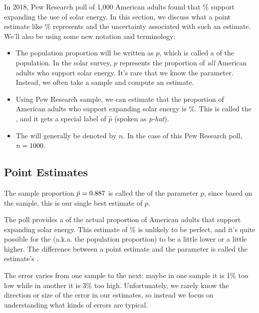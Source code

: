 In 2018, Pew Research poll of 1,000 American adults found that
\pewsolarpollpercent{}\% support expanding the use of solar energy.
In this section, we discuss what a point estimate like
\pewsolarpollpercent{}\% represents
and the uncertainty associated with such an estimate. We'll also
be using some new notation and terminology:
\begin{itemize}
\item The population proportion will be written as $p$, which
    is called a  of the population. In the solar
    survey, $p$ represents the proportion of \emph{all}
    American adults who support solar energy. It's rare
    that we know the parameter. Instead, we often
    take a sample and compute an estimate.
\item Using Pew Research sample, we can estimate that the proportion
    of American adults who support expanding solar energy is
    \pewsolarpollpercent{}\%.
    This is called the , and it gets a special
    label of $\hat{p}$ (spoken as \emph{p-hat}).
\item The  will generally
    be denoted by $n$. In the case of this Pew Research poll,
    $n = 1000{}$.
\end{itemize}

\subsection{Point Estimates}
\label{pointEstimates}


The sample proportion $\hat{p} = 0.887{}$ is called
the  of the parameter $p$, since based
on the sample, this is our single best estimate of $p$.

The poll provides a  of the actual proportion
of American adults that support expanding solar energy.
This estimate of \pewsolarpollpercent{}\% is unlikely to be perfect,
and it's quite possible for the 
(a.k.a. the population proportion) to be a little lower
or a little higher. The difference between a point estimate
and the parameter is called the estimate's .

The error varies from one sample to the next: maybe
in one sample it is 1\% too low while in another
it is 3\% too high. Unfortunately, we rarely know the direction
or size of the error in our estimates, so instead we focus
on understanding what kinds of errors are typical.


